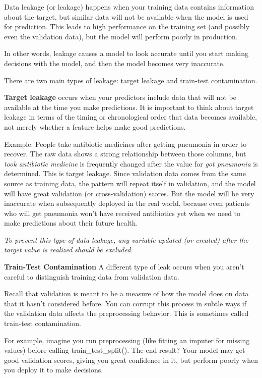 \documentclass[12pt]{report}
\begin{document}
Data leakage (or leakage) happens when your training data contains information about the target, but similar data will not be available when the model is used for prediction. This leads to high performance on the training set (and possibly even the validation data), but the model will perform poorly in production.

In other words, leakage causes a model to look accurate until you start making decisions with the model, and then the model becomes very inaccurate.

There are two main types of leakage: target leakage and train-test contamination.

\textbf{Target leakage} occurs when your predictors include data that will not be available at the time you make predictions. It is important to think about target leakage in terms of the timing or chronological order that data becomes available, not merely whether a feature helps make good predictions.

Example: People take antibiotic medicines after getting pneumonia in order to recover. The raw data shows a strong  relationship between those columns, but \textit{took antibiotic medicine} is frequently changed after the value for \textit{got pneumonia} is determined. This is target leakage. Since validation data comes from the same source as training data, the pattern will repeat itself in validation, and the model will have great validation (or cross-validation) scores. But the model will be very inaccurate when subsequently deployed in the real world, because even patients who will get pneumonia won't have received antibiotics yet when we need to make predictions about their future health.

\textit{To prevent this type of data leakage, any variable updated (or created) after the target value is realized should be excluded.}

\textbf{Train-Test Contamination}
A different type of leak occurs when you aren't careful to distinguish training data from validation data.

Recall that validation is meant to be a measure of how the model does on data that it hasn't considered before. You can corrupt this process in subtle ways if the validation data affects the preprocessing behavior. This is sometimes called train-test contamination.

For example, imagine you run preprocessing (like fitting an imputer for missing values) before calling train\_test\_split(). The end result? Your model may get good validation scores, giving you great confidence in it, but perform poorly when you deploy it to make decisions.
\end{document}

